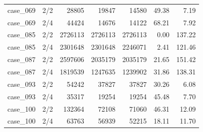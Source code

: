 \begin{tabular}{llrrrrr}
case\_069 & 2/2 & 28805 & 19847 & 14580 & 49.38 & 7.19 \\
case\_069 & 2/4 & 44424 & 14676 & 14122 & 68.21 & 7.92 \\
case\_085 & 2/2 & 2726113 & 2726113 & 2726113 & 0.00 & 137.22 \\
case\_085 & 2/4 & 2301648 & 2301648 & 2246071 & 2.41 & 121.46 \\
case\_087 & 2/2 & 2597606 & 2035179 & 2035179 & 21.65 & 151.42 \\
case\_087 & 2/4 & 1819539 & 1247635 & 1239902 & 31.86 & 138.31 \\
case\_093 & 2/2 & 54242 & 37827 & 37827 & 30.26 & 6.08 \\
case\_093 & 2/4 & 35317 & 19254 & 19254 & 45.48 & 7.70 \\
case\_100 & 2/2 & 132364 & 72108 & 71060 & 46.31 & 12.09 \\
case\_100 & 2/4 & 63763 & 56939 & 52215 & 18.11 & 11.70 \\
\bottomrule
\end{tabular}
